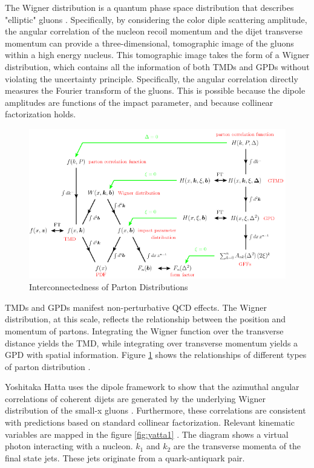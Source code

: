The Wigner distribution is a quantum phase space distribution that describes "elliptic" gluons \cite{Belitsky:2003nz}. Specifically, by considering the color diple scattering amplitude, the angular correlation of the nucleon recoil momentum and the dijet transverse momentum can provide a three-dimensional, tomographic image of the gluons within a high energy nucleus. This tomographic image takes the form of a Wigner distribution, which contains all the information of both TMDs and GPDs without violating the uncertainty principle. Specifically, the angular correlation directly measures the Fourier transform of the gluons. This is possible because the dipole amplitudes are functions of the impact parameter, and because collinear factorization holds. 

\begin{figure}[h!]
\begin{centering}
\includegraphics[width=7in]{Chapter1/importfigs/fig6_introGPD_TMD.png}
\par\end{centering}
\caption{Interconnectedness of Parton Distributions \cite{Diehl:2003ny} \label{fig:gpdTMDWeb}}
\end{figure}

TMDs and GPDs manifest non-perturbative QCD effects. The Wigner distribution, at this scale, reflects the relationship between the position and momentum of partons. Integrating the Wigner function over the transverse distance yields the TMD, while integrating over transverse momentum yields a GPD with spatial information. Figure \ref{fig:gpdTMDWeb} shows the relationships of different types of parton distribution \cite{Diehl:2003ny}.  

Yoshitaka Hatta uses the dipole framework to show that the azimuthal angular correlations of coherent dijets are generated by the underlying Wigner distribution of the small-x gluons \cite{Hatta:2017cte}. Furthermore, these correlations are consistent with predictions based on standard collinear factorization. Relevant kinematic variables are mapped in the figure \ref{fig:yatta1} \cite{Hatta:2016dxp}. The diagram shows a virtual photon interacting with a nucleon. $k_1$ and $k_2$ are the transverse momenta of the final state jets. These jets originate from a quark-antiquark pair\cite{Hagiwara:2016kam}. 

